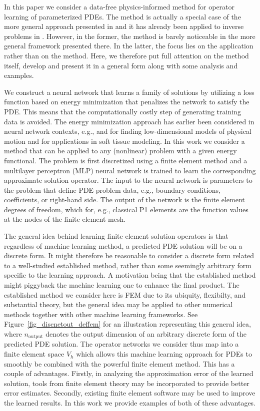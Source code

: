 \documentclass[12pt]{article}
\begin{document}
In this paper we consider a data-free physics-informed method for operator learning of parameterized PDEs. The method is actually a special case of the more general approach presented in \cite{sharp2023} and it has already been applied to inverse problems in \cite{BURMAN2025118111}. However, in the former, the method is barely noticeable in the more general framework presented there. In the latter, the focus lies on the application rather than on the method. Here, we therefore put full attention on the method itself, develop and present it in a general form along with some analysis and examples.

We construct a neural network that learns a family of solutions by utilizing a loss function based on energy minimization that penalizes the network to satisfy the PDE. This means that the computationally costly step of generating training data is avoided. The energy minimization approach has earlier been considered in neural network contexts, e.g., \cite{E_etal_2018, samaniego_energy_2020, Li2021, ESHAGHI2025} and \cite{sharp2023} for finding low-dimensional models of physical motion and \cite{Sacks2022} for applications in soft tissue modeling. In this work we consider a method that can be applied to any (nonlinear) problem with a given energy functional. The problem is first discretized using a finite element method and a multilayer perceptron (MLP) neural network is trained to learn the corresponding approximate solution operator. The input to the neural network is parameters to the problem that define PDE problem data, e.g., boundary conditions, coefficients, or right-hand side. The output of the network is the finite element degrees of freedom, which for, e.g., classical P1 elements are the function values at the nodes of the finite element mesh.

The general idea behind learning finite element solution operators is that regardless of machine learning method, a predicted PDE solution will be on a discrete form. It might therefore be reasonable to consider a discrete form related to a well-studied established method, rather than some seemingly arbitrary form specific to the learning approach. A motivation being that the established method might piggyback the machine learning one to enhance the final product. The established method we consider here is FEM due to its ubiquity, flexibilty, and substantial theory, but the general idea may be applied to other numerical methods together with other machine learning frameworks. See Figure~\ref{fig_discnetout_deffem} for an illustration representing this general idea, where $n_\text{output}$ denotes the output dimension of an arbitrary discrete form of the predicted PDE solution. The operator networks we consider thus map into a finite element space $V_h$ which allows this machine learning approach for PDEs to smoothly be combined with the powerful finite element method. This has a couple of advantages. Firstly, in analyzing the approximation error of the learned solution, tools from finite element theory may be incorporated to provide better error estimates. Secondly, existing finite element software may be used to improve the learned results. In this work we provide examples of both of these advantages.
\end{document}
